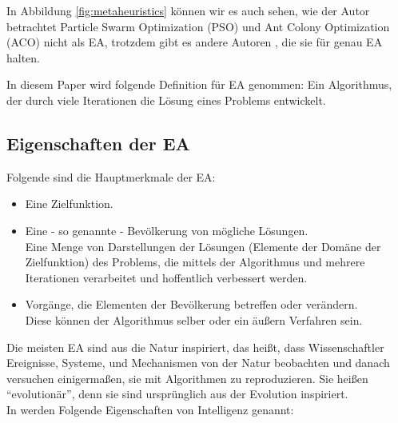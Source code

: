 \documentclass[twoside,twocolumn]{article}
\begin{document}
In Abbildung \ref{fig:metaheuristics} können wir es auch sehen, wie der Autor betrachtet Particle Swarm Optimization (PSO) und Ant Colony Optimization (ACO) nicht als EA, trotzdem gibt es andere Autoren \cite{wiley_evolutionary}, die sie für genau EA halten.

In diesem Paper wird folgende Definition für EA genommen: Ein Algorithmus, der durch viele Iterationen die Lösung eines Problems entwickelt.

\subsection{Eigenschaften der EA}
Folgende sind die Hauptmerkmale der EA:

\begin{itemize}
\item{Eine Zielfunktion.}\\
\item{Eine - so genannte - Bevölkerung von mögliche Lösungen.}\\
Eine Menge von Darstellungen der Lösungen (Elemente der Domäne der Zielfunktion) des Problems, die mittels der Algorithmus und mehrere Iterationen verarbeitet und hoffentlich verbessert werden.\\
\item{Vorgänge, die Elementen der Bevölkerung betreffen oder verändern.}\\
Diese können der Algorithmus selber oder ein äußern Verfahren sein.
\end{itemize}

Die meisten EA sind aus die Natur inspiriert, das heißt, dass Wissenschaftler Ereignisse, Systeme, und Mechanismen von der Natur beobachten und danach versuchen einigermaßen, sie mit Algorithmen zu reproduzieren. Sie heißen ``evolutionär'', denn sie sind ursprünglich aus der Evolution inspiriert. \cite{holland_ga}\\

In \cite{wiley_evolutionary} werden Folgende Eigenschaften von Intelligenz genannt:
\end{document}
